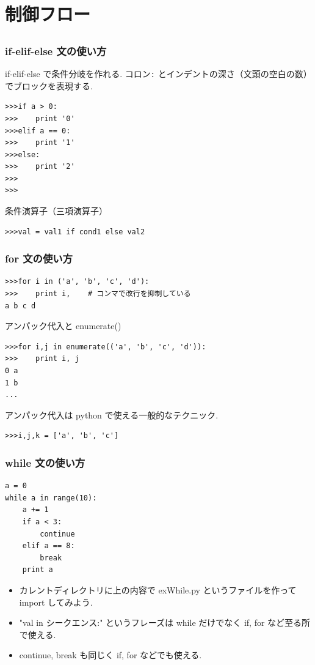 \subsection*{\redm\whitem\greenb}

\section{制御フロー}
\subsection*{\redm\whitem\greenb}

\begin{frame}[t,fragile]
\frametitle{if-elif-else 文の使い方}
if-elif-else で条件分岐を作れる.
コロン\verb|:| とインデントの深さ（文頭の空白の数）でブロックを表現する.
\begin{lstlisting}[stepnumber=1]
>>>if a > 0:
>>>    print '0'
>>>elif a == 0:
>>>    print '1'
>>>else:
>>>    print '2'
>>>
>>>
\end{lstlisting}

条件演算子（三項演算子）

\begin{lstlisting}
>>>val = val1 if cond1 else val2
\end{lstlisting}

\end{frame}

\begin{frame}[t,fragile]
\frametitle{for 文の使い方}
\begin{lstlisting}
>>>for i in ('a', 'b', 'c', 'd'):
>>>    print i,    # コンマで改行を抑制している
a b c d
\end{lstlisting}

アンパック代入と enumerate()
\begin{lstlisting}
>>>for i,j in enumerate(('a', 'b', 'c', 'd')):
>>>    print i, j
0 a
1 b
...
\end{lstlisting}
アンパック代入は python で使える一般的なテクニック. 
\begin{lstlisting}
>>>i,j,k = ['a', 'b', 'c']
\end{lstlisting}
\end{frame}

\begin{frame}[t,fragile]
\frametitle{while 文の使い方}
\begin{lstlisting}
a = 0
while a in range(10):
    a += 1
    if a < 3:
        continue
    elif a == 8:
        break
    print a

\end{lstlisting}

\begin{itemize}
\item カレントディレクトリに上の内容で exWhile.py というファイルを作って import してみよう.
\item "val in シークエンス:" というフレーズは while だけでなく if, for など至る所で使える.
\item continue, break も同じく if, for などでも使える.
\end{itemize}

\end{frame}

